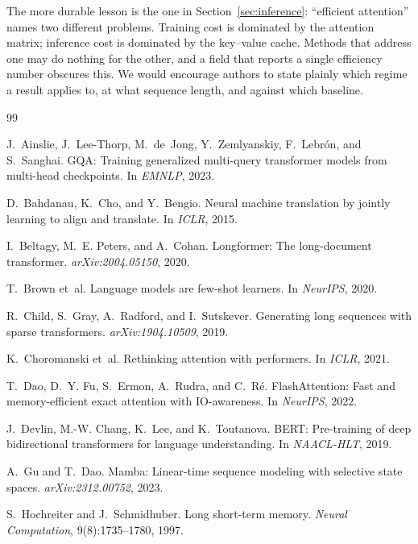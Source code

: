 \documentclass[11pt,a4paper]{article}
\begin{document}
The more durable lesson is the one in Section~\ref{sec:inference}: ``efficient
attention'' names two different problems. Training cost is dominated by the
attention matrix; inference cost is dominated by the key--value cache. Methods
that address one may do nothing for the other, and a field that reports a
single efficiency number obscures this. We would encourage authors to state
plainly which regime a result applies to, at what sequence length, and against
which baseline.

\begin{thebibliography}{99}

J.~Ainslie, J.~Lee-Thorp, M.~de~Jong, Y.~Zemlyanskiy, F.~Lebrón, and
S.~Sanghai.
\newblock GQA: Training generalized multi-query transformer models from
  multi-head checkpoints.
\newblock In \emph{EMNLP}, 2023.

D.~Bahdanau, K.~Cho, and Y.~Bengio.
\newblock Neural machine translation by jointly learning to align and
  translate.
\newblock In \emph{ICLR}, 2015.

I.~Beltagy, M.~E. Peters, and A.~Cohan.
\newblock Longformer: The long-document transformer.
\newblock \emph{arXiv:2004.05150}, 2020.

T.~Brown et~al.
\newblock Language models are few-shot learners.
\newblock In \emph{NeurIPS}, 2020.

R.~Child, S.~Gray, A.~Radford, and I.~Sutskever.
\newblock Generating long sequences with sparse transformers.
\newblock \emph{arXiv:1904.10509}, 2019.

K.~Choromanski et~al.
\newblock Rethinking attention with performers.
\newblock In \emph{ICLR}, 2021.

T.~Dao, D.~Y. Fu, S.~Ermon, A.~Rudra, and C.~Ré.
\newblock FlashAttention: Fast and memory-efficient exact attention with
  IO-awareness.
\newblock In \emph{NeurIPS}, 2022.

J.~Devlin, M.-W. Chang, K.~Lee, and K.~Toutanova.
\newblock BERT: Pre-training of deep bidirectional transformers for language
  understanding.
\newblock In \emph{NAACL-HLT}, 2019.

A.~Gu and T.~Dao.
\newblock Mamba: Linear-time sequence modeling with selective state spaces.
\newblock \emph{arXiv:2312.00752}, 2023.

S.~Hochreiter and J.~Schmidhuber.
\newblock Long short-term memory.
\newblock \emph{Neural Computation}, 9(8):1735--1780, 1997.


\end{thebibliography}
\end{document}
